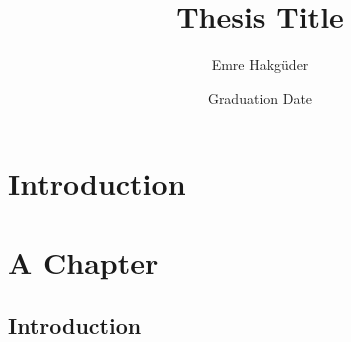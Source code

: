 \documentclass{ucetd}
\title{Thesis Title}
\author{Emre Hakgüder}
\date{Graduation Date}
\begin{document}
\maketitle

\makecopyright
\makededication
\makeepigraph


\tableofcontents
\listoffigures
\listoftables

\acknowledgments

\abstract

\mainmatter

\chapter{Introduction}

\chapter{A Chapter}
\section{Introduction}

\makebibliography

%
%
\end{document}
